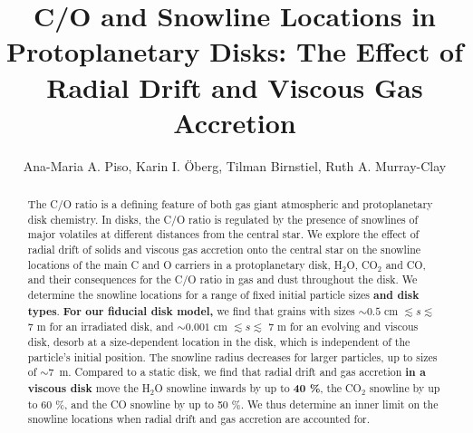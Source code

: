 \documentclass[apj]{emulateapj}
\begin{document}


\title{C/O and Snowline Locations in Protoplanetary Disks: The Effect of Radial Drift and Viscous Gas Accretion}

\author{Ana-Maria A. Piso, Karin I. \"Oberg, Tilman Birnstiel, Ruth A. Murray-Clay}


\begin{abstract}
The C/O ratio is a defining feature of both gas giant atmospheric and protoplanetary disk chemistry. In disks, the C/O ratio is regulated by the presence of snowlines of major volatiles at different distances from the central star.
We explore the effect of radial drift of solids and viscous gas accretion onto the central star on the snowline locations of the main C and O carriers in a protoplanetary disk, H$_2$O, CO$_2$ and CO, and their consequences for the C/O ratio in gas and dust throughout the disk. We determine the snowline locations for a range of fixed initial particle sizes \textbf{and disk types}. \textbf{For our fiducial disk model,} we find that grains with sizes $\sim$$0.5$ cm $\lesssim s \lesssim$ 7 m for an irradiated disk, and $\sim$$0.001$ cm $\lesssim s \lesssim$ 7 m for an evolving and viscous disk, desorb %
at a %
size-dependent location in the disk, which is independent %
of the particle's initial position. The snowline radius decreases for larger particles, up to sizes of $\sim$7~m. %
Compared to a static disk, we find that radial drift and gas accretion \textbf{in a viscous disk} move the H$_2$O snowline inwards by up to \textbf{40 \%}, the CO$_2$ snowline by up to 60 \%, and the CO snowline by up to 50 \%. We thus determine an inner limit on the snowline locations when radial drift and gas accretion are accounted for. %
\end{abstract}
\end{document}
